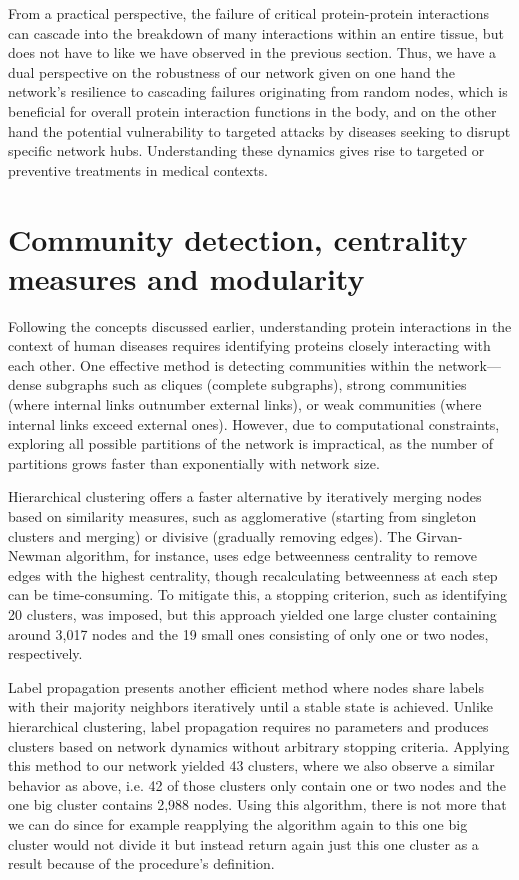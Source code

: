 \documentclass[paper=a4,fontsize=11pt,DIV=8,BCOR=5mm,oneside,pdftex,bibtotocnumbered]{scrreprt}
\theoremstyle{plain}
\begin{document}
	From a practical perspective, the failure of critical protein-protein interactions can cascade into the breakdown of many interactions within an entire tissue, but does not have to like we have observed in the previous section. Thus, we have a dual perspective on the robustness of our network given on one hand the network's resilience to cascading failures originating from random nodes, which is beneficial for overall protein interaction functions in the body, and on the other hand the potential vulnerability to targeted attacks by diseases seeking to disrupt specific network hubs. Understanding these dynamics gives rise to targeted or preventive treatments in medical contexts.
	
	\section{Community detection, centrality measures and modularity}
	Following the concepts discussed earlier, understanding protein interactions in the context of human diseases requires identifying proteins closely interacting with each other. One effective method is detecting communities within the network—dense subgraphs such as cliques (complete subgraphs), strong communities (where internal links outnumber external links), or weak communities (where internal links exceed external ones). However, due to computational constraints, exploring all possible partitions of the network is impractical, as the number of partitions grows faster than exponentially with network size.
	
	Hierarchical clustering offers a faster alternative by iteratively merging nodes based on similarity measures, such as agglomerative (starting from singleton clusters and merging) or divisive (gradually removing edges). The Girvan-Newman algorithm, for instance, uses edge betweenness centrality to remove edges with the highest centrality, though recalculating betweenness at each step can be time-consuming. To mitigate this, a stopping criterion, such as identifying 20 clusters, was imposed, but this approach yielded one large cluster containing around 3,017 nodes and the 19 small ones consisting of only one or two nodes, respectively. 
	
	Label propagation presents another efficient method where nodes share labels with their majority neighbors iteratively until a stable state is achieved. Unlike hierarchical clustering, label propagation requires no parameters and produces clusters based on network dynamics without arbitrary stopping criteria. Applying this method to our network yielded 43 clusters, where we also observe a similar behavior as above, i.e. 42 of those clusters only contain one or two nodes and the one big cluster contains 2,988 nodes. Using this algorithm, there is not more that we can do since for example reapplying the algorithm again to this one big cluster would not divide it but instead return again just this one cluster as a result because of the procedure's definition.
	
\end{document}
